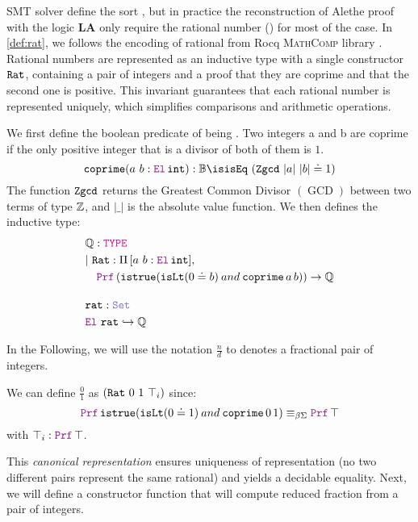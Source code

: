 
SMT solver define the sort , but in practice the reconstruction of Alethe proof with the logic \textbf{LA} only require the rational number (\Q) for most of the case.
In \cref{def:rat}, we follows the encoding of rational from Rocq \cite{Rocq-refman} \textsc{MathComp} library \cite{mathcomp}.
Rational numbers are represented as an inductive type with a single constructor $\texttt{\upshape{Rat}}$, containing a pair of integers and a proof that they are coprime and that the second one is positive.
This invariant guarantees that each rational number is represented uniquely, which simplifies comparisons and arithmetic operations.

\begin{definition}[Rational]\label{def:rat}
We first define the boolean predicate of being . Two integers a and b are coprime if the only positive integer that is a divisor of both of them is $1$.
\begin{equation*}
\kw{coprime} (a~b: \el\,\kw{int}): \B \is  \kw{isEq}~(\kw{Zgcd}~|a|~|b| \doteq 1)
\end{equation*}
The function $\texttt{\upshape{Zgcd}}$ returns the Greatest Common Divisor $(\mathop{GCD})$ between two terms of type $\mathbb{Z}$, and $|\_|$ is the absolute value function.
We then defines the inductive type:
\begin{align*}
& \Q: \type \\
& |~\kw{Rat}: \Pi\,[a~b: \el\,\kw{int}],\\
& \quad \prf\, (\kw{istrue} (\kw{isLt} (0 \doteq b) \mathbin{and} \kw{coprime}\,a\,b)) \ra \Q \\[1em]
&\kw{rat}: \set{} \\
&\el~\kw{rat} \re \Q
\end{align*}
\end{definition}

In the Following, we will use the notation $\frac{n}{d}$ to denotes a fractional pair of integers.


\begin{example}
We can define $\frac{0}{1}$ as $(\texttt{\upshape{Rat}}~0~1~\top_i)$ since:
\[
\prf\, \kw{istrue} (\kw{isLt} (0 \doteq 1) \mathbin{and} \kw{coprime}\,0\,1) \equivL \prf\,\top
\]
with $\top_i : \prf\,\top$.
\end{example}

This \emph{canonical representation} ensures uniqueness of representation (no two different pairs represent the same rational) and yields a decidable equality.
Next, we will define a constructor function that will compute reduced fraction from a pair of integers.

